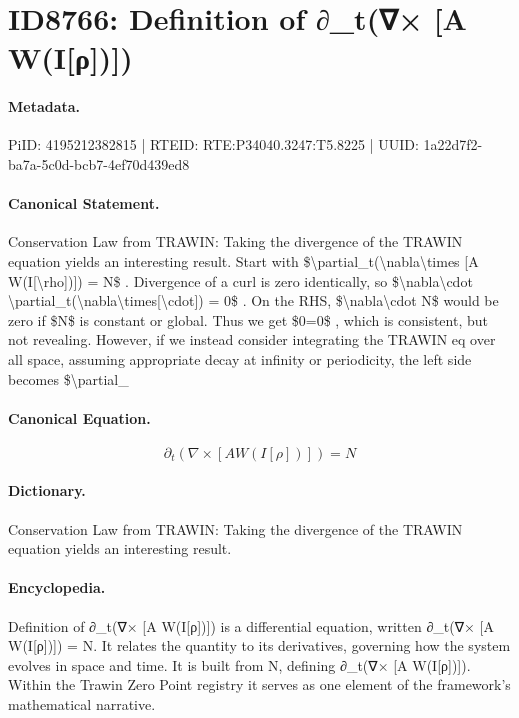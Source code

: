 \section*{ID8766: Definition of ∂\_t(∇× [A W(I[ρ])])}
\paragraph{Metadata.}
PiID: 4195212382815 | RTEID: RTE:P34040.3247:T5.8225 | UUID: 1a22d7f2-ba7a-5c0d-bcb7-4ef70d439ed8

\paragraph{Canonical Statement.}
Conservation Law from TRAWIN: Taking the divergence of the TRAWIN equation yields an interesting result. Start with \$\textbackslash{}partial\_t(\textbackslash{}nabla\textbackslash{}times [A W(I[\textbackslash{}rho])]) = N\$ . Divergence of a curl is zero identically, so \$\textbackslash{}nabla\textbackslash{}cdot \textbackslash{}partial\_t(\textbackslash{}nabla\textbackslash{}times[\textbackslash{}cdot]) = 0\$ . On the RHS, \$\textbackslash{}nabla\textbackslash{}cdot N\$ would be zero if \$N\$ is constant or global. Thus we get \$0=0\$ , which is consistent, but not revealing. However, if we instead consider integrating the TRAWIN eq over all space, assuming appropriate decay at infinity or periodicity, the left side becomes \$\textbackslash{}partial\_

\paragraph{Canonical Equation.}
\[
\partial_t(\nabla\times [A W(I[\rho])]) = N
\]

\paragraph{Dictionary.}
Conservation Law from TRAWIN: Taking the divergence of the TRAWIN equation yields an interesting result.

\paragraph{Encyclopedia.}
Definition of ∂\_t(∇× [A W(I[ρ])]) is a differential equation, written ∂\_t(∇× [A W(I[ρ])]) = N. It relates the quantity to its derivatives, governing how the system evolves in space and time. It is built from N, defining ∂\_t(∇× [A W(I[ρ])]). Within the Trawin Zero Point registry it serves as one element of the framework's mathematical narrative.
